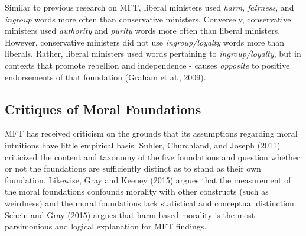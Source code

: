 \documentclass[
  man,floatsintext]{apa6}
\begin{document}
Similar to previous research on MFT, liberal ministers used \emph{harm}, \emph{fairness}, and \emph{ingroup} words more often than conservative ministers. Conversely, conservative ministers used \emph{authority} and \emph{purity} words more often than liberal ministers. However, conservative ministers did not use \emph{ingroup/loyalty} words more than liberals. Rather, liberal ministers used words pertaining to \emph{ingroup/loyalty}, but in contexts that promote rebellion and independence - causes \emph{opposite} to positive endorsements of that foundation (Graham et al., 2009).

\hypertarget{critiques-of-moral-foundations}{%
\subsection{Critiques of Moral Foundations}\label{critiques-of-moral-foundations}}

MFT has received criticism on the grounds that its assumptions regarding moral intuitions have little empirical basis. Suhler, Churchland, and Joseph (2011) criticized the content and taxonomy of the five foundations and question whether or not the foundations are sufficiently distinct as to stand as their own foundation. Likewise, Gray and Keeney (2015) argues that the measurement of the moral foundations confounds morality with other constructs (such as weirdness) and the moral foundations lack statistical and conceptual distinction. Schein and Gray (2015) argues that harm-based morality is the most parsimonious and logical explanation for MFT findings.
\end{document}
